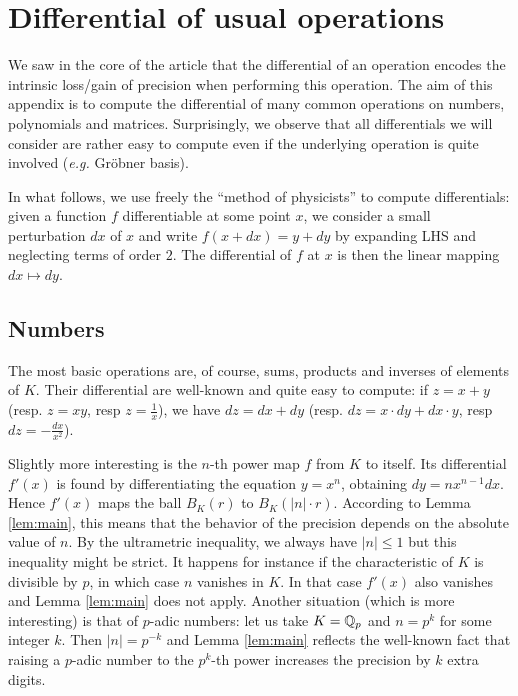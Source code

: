\documentclass{lms}
\begin{document}
\section{Differential of usual operations}
\label{ssec:differentials}

We saw in the core of the article that the differential of an operation 
encodes the intrinsic loss/gain of precision when performing this 
operation. The aim of this appendix is to compute the differential of 
many common operations on numbers, polynomials and matrices. Surprisingly, 
we observe that all differentials we will consider are rather easy to 
compute even if the underlying operation is quite involved (\emph{e.g.} 
Gr\"obner basis).

In what follows, we use freely the ``method of physicists'' to compute 
differentials: given a function $f$ differentiable at some point $x$, we 
consider a small perturbation $dx$ of $x$ and write $f(x+dx) = y + dy$ 
by expanding LHS and neglecting terms of order $2$. The differential of 
$f$ at $x$ is then the linear mapping $dx \mapsto dy$.

\subsection{Numbers}

The most basic operations are, of course, sums, products and inverses of 
elements of $K$. Their differential are well-known and quite easy to 
compute: if $z = x + y$ (resp. $z = xy$, resp $z = \frac 1 x$), we have 
$dz = dx + dy$ (resp. $dz = x \cdot dy + dx \cdot y$, resp $dz = - 
\frac{dx}{x^2}$).


Slightly more interesting is the $n$-th power map $f$ from $K$ to 
itself. Its differential $f'(x)$ is found by differentiating the 
equation $y = x^n$, obtaining $dy = n x^{n-1} dx$.
Hence $f'(x)$ maps the ball $B_K(r)$ to $B_K(|n|{\cdot} r)$. According to Lemma \ref{lem:main}, this 
means that the behavior of the precision depends on the absolute value 
of $n$. By the ultrametric inequality, we always have $|n| \leq 1$ but 
this inequality might be strict. It happens for instance if the 
characteristic of $K$ is divisible by $p$, in which case $n$ vanishes in 
$K$. In that case $f'(x)$ also vanishes and Lemma \ref{lem:main} does 
not apply. 
Another situation (which is more interesting) is that of $p$-adic 
numbers: let us take $K = \mathbb Q_p$ and $n = p^k$ for some integer $k$. Then
$|n| = p^{-k}$ and Lemma \ref{lem:main} reflects the well-known fact that
raising a $p$-adic number to the $p^k$-th power increases the precision 
by $k$ extra digits.
\end{document}
